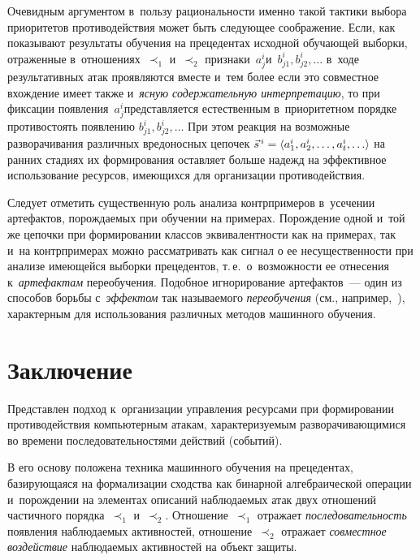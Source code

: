 \begin{multicols}{2}
  Очевидным аргументом в~пользу рациональ\-ности именно такой тактики 
выбора приоритетов противодействия может быть следующее соображение. 
Если, как показывают результаты обучения на прецедентах исходной 
обучающей выборки, отраженные в~отношениях~$\prec_1$ и~$\prec_2$ 
признаки~$a_j^i$\linebreak и~$b^i_{j1}, b^i_{j2}, \ldots$ в~ходе результативных атак 
проявляются вместе и~тем более если это совместное вхож\-дение имеет также 
и~\textit{ясную содержательную ин\-терпретацию}, то при фиксации 
появления~$a^i_j$\linebreak представляет\-ся естественным в~приоритетном порядке 
противостоять появлению $b^i_{j1}, b^i_{j2},\ldots$ При этом реакция на 
возможные разворачивания различных вредоносных цепочек $\vec{s}^{\,i}\hm= 
\langle a_1^i, a_2^i, \ldots , a_t^i,\ldots\rangle$ на ранних стадиях их 
формирования оставляет больше надежд на эффективное использование 
ресурсов, имеющихся для организации противодействия.
  
  Следует отметить существенную роль анализа контрпримеров в~усечении 
артефактов, порож\-да\-емых при обучении на примерах. Порождение одной и~той 
же цепочки при формировании классов эквивалентности как на примерах, так 
и~на контрпримерах можно рассматривать как сигнал о ее несущественности 
при анализе имеющейся выборки прецедентов, т.\,е.\ о~возможности ее 
отнесения к~\textit{артефактам} переобучения. Подобное игнорирование 
артефактов~--- один из способов борьбы с~\textit{эффектом} так называемого 
\textit{переобучения} (см., например,~\cite{13-gr}), характерным для 
использования различных методов машинного обучения.

\section{Заключение}

  Представлен подход к~организации управления ресурсами при формировании 
противодействия компьютерным атакам, характеризуемым разворачивающимися 
во времени последовательностями действий (событий).
  
  В его основу положена техника машинного обуче\-ния на прецедентах, 
базирующаяся на формализации сходства как бинарной алгебраической 
операции и~порождении на элементах описаний наблюдаемых атак двух 
отношений частичного порядка~$\prec_1$ и~$\prec_2$. Отношение~$\prec_1$ 
отражает \textit{последовательность} появления наблюдаемых активностей, 
отношение~$\prec_2$ отражает \textit{совместное воздействие} наблюдаемых 
активностей на объект защиты.
  

\end{multicols}
